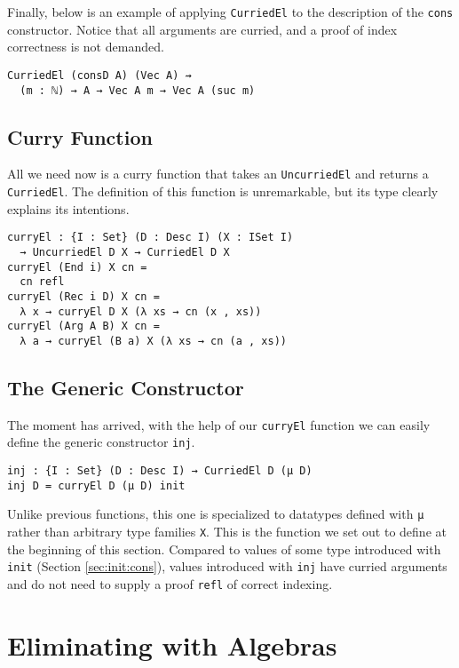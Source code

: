 \documentclass[preprint,nonatbib]{sigplanconf}
\newcommand{\refsec}[1]{Section \ref{sec:#1}}
\begin{document}
Finally, below is an example of applying {\tt CurriedEl} to the
description of the {\tt cons} constructor. Notice that all arguments
are curried, and a proof of index correctness is not demanded.

\begin{verbatim}
CurriedEl (consD A) (Vec A) ⇝
  (m : ℕ) → A → Vec A m → Vec A (suc m)
\end{verbatim}

\subsection{Curry Function}

All we need now is a curry function that takes an
{\tt UncurriedEl} and returns a {\tt CurriedEl}. The definition of
this function is unremarkable, but its type clearly explains its
intentions.

\begin{verbatim}
curryEl : {I : Set} (D : Desc I) (X : ISet I)
  → UncurriedEl D X → CurriedEl D X
curryEl (End i) X cn =
  cn refl
curryEl (Rec i D) X cn =
  λ x → curryEl D X (λ xs → cn (x , xs))
curryEl (Arg A B) X cn =
  λ a → curryEl (B a) X (λ xs → cn (a , xs))
\end{verbatim}

\subsection{The Generic Constructor}

The moment has arrived, with the help of our {\tt curryEl} function we
can easily define the generic constructor {\tt inj}.

\begin{verbatim}
inj : {I : Set} (D : Desc I) → CurriedEl D (μ D)
inj D = curryEl D (μ D) init
\end{verbatim}

Unlike previous functions, this one is specialized to datatypes
defined with {\tt μ} rather than arbitrary type families {\tt X}. This
is the function we set out to define at the beginning of this section.
Compared to values of some type introduced with {\tt init} (\refsec{init:cons}),
values introduced with {\tt inj} have curried arguments and do not
need to supply a proof {\tt refl} of correct indexing.

\section{Eliminating with Algebras}
\label{sec:ind}
\end{document}
